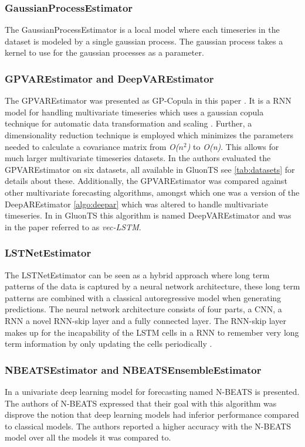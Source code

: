 \subsubsection{GaussianProcessEstimator}
The GaussianProcessEstimator is a local model where each timeseries in the dataset is modeled by a single gaussian process. The gaussian process takes a kernel to use for the gaussian processes as a parameter. 
\cite{gluonts-website}

\subsubsection{GPVAREstimator and DeepVAREstimator}
\label{algo:gpvar}
The GPVAREstimator was presented as GP-Copula in this paper \cite{salinas_high-dimensional_2019}. It is a RNN model for handling multivariate timeseries which uses a gaussian copula technique for automatic data transformation and scaling . Further, a dimensionality reduction technique is employed which minimizes the parameters needed to calculate a covariance matrix from \textit{O($n^2$)} to \textit{O(n)}. This allows for much larger multivariate timeseries datasets. In \cite{salinas_high-dimensional_2019} the authors evaluated the GPVAREstimator on six datasets, all available in GluonTS see \ref{tab:datasets} for details about these. Additionally, the GPVAREstimator was compared against other multivariate forecasting algorithms, amongst which one was a version of the DeepAREstimator \ref{algo:deepar} which was altered to handle multivariate timeseries. In in GluonTS this algorithm is named DeepVAREstimator and was in the paper referred to as \textit{vec-LSTM}. 

\subsubsection{LSTNetEstimator}
The LSTNetEstimator can be seen as a hybrid approach where long term patterns of the data is captured by a neural network architecture, these long term patterns are combined with a classical autoregressive model when generating predictions. The neural network architecture consists of four parts, a CNN, a RNN a novel RNN-skip layer and a fully connected layer. The RNN-skip layer makes up for the incapability of the LSTM cells in a RNN to remember very long term information by only updating the cells periodically \cite{lai_modeling_2018}.

\subsubsection{NBEATSEstimator and NBEATSEnsembleEstimator}
In \cite{oreshkin_n-beats_2020} a univariate deep learning model for forecasting named N-BEATS is presented. The authors of N-BEATS expressed that their goal with this algorithm was disprove the notion that deep learning models had inferior performance  compared to classical models. The authors reported a higher accuracy with the N-BEATS model over all the models it was compared to. 

